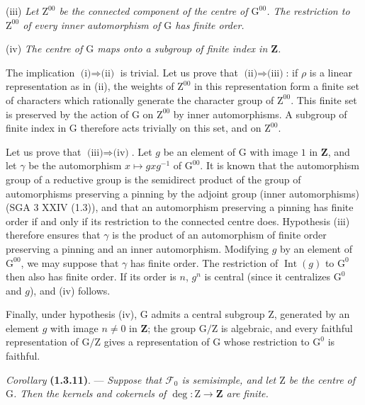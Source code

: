 \documentclass[11pt,leqno]{article}
\begin{document}
(iii) \textit{Let \(\mathrm{Z}^{00}\) be the connected component of the centre of \(\mathrm{G}^{00}\). The restriction to \(\mathrm{Z}^{00}\) of every inner automorphism of \(\mathrm{G}\) has finite order.}

(iv) \textit{The centre of \(\mathrm{G}\) maps onto a subgroup of finite index in \(\mathbf{Z}\).}

The implication \(\text{(i)}\Rightarrow\text{(ii)}\) is trivial. Let us prove that \(\text{(ii)}\Rightarrow\text{(iii)}\): if \(\rho\) is a linear representation as in (ii), the weights of \(\mathrm{Z}^{00}\) in this representation form a finite set of characters which rationally generate the character group of \(\mathrm{Z}^{00}\). This finite set is preserved by the action of \(\mathrm{G}\) on \(\mathrm{Z}^{00}\) by inner automorphisms. A subgroup of finite index in \(\mathrm{G}\) therefore acts trivially on this set, and on \(\mathrm{Z}^{00}\).

Let us prove that \(\text{(iii)}\Rightarrow\text{(iv)}\). Let \(g\) be an element of \(\mathrm{G}\) with image \(1\) in \(\mathbf{Z}\), and let \(\gamma\) be the automorphism \(x\mapsto gxg^{-1}\) of \(\mathrm{G}^{00}\). It is known that the automorphism group of a reductive group is the semidirect product of the group of automorphisms preserving a pinning by the adjoint group (inner automorphisms) (SGA 3 XXIV (1.3)), and that an automorphism preserving a pinning has finite order if and only if its restriction to the connected centre does. Hypothesis (iii) therefore ensures that \(\gamma\) is the product of an automorphism of finite order preserving a pinning and an inner automorphism. Modifying \(g\) by an element of \(\mathrm{G}^{00}\), we may suppose that \(\gamma\) has finite order. The restriction of \(\operatorname{Int}(g)\) to \(\mathrm{G}^0\) then also has finite order. If its order is \(n\), \(g^n\) is central (since it centralizes \(\mathrm{G}^0\) and \(g\)), and (iv) follows.

Finally, under hypothesis (iv), \(\mathrm{G}\) admits a central subgroup \(\mathrm{Z}\), generated by an element \(g\) with image \(n\ne0\) in \(\mathbf{Z}\); the group \(\mathrm{G}/\mathrm{Z}\) is algebraic, and every faithful representation of \(\mathrm{G}/\mathrm{Z}\) gives a representation of \(\mathrm{G}\) whose restriction to \(\mathrm{G}^0\) is faithful.

\textit{Corollary} \textbf{(1.3.11)}. — \textit{Suppose that \(\mathscr{F}_0\) is semisimple, and let \(\mathrm{Z}\) be the centre of \(\mathrm{G}\). Then the kernels and cokernels of \(\deg:\mathrm{Z}\to\mathbf{Z}\) are finite.}
\end{document}
